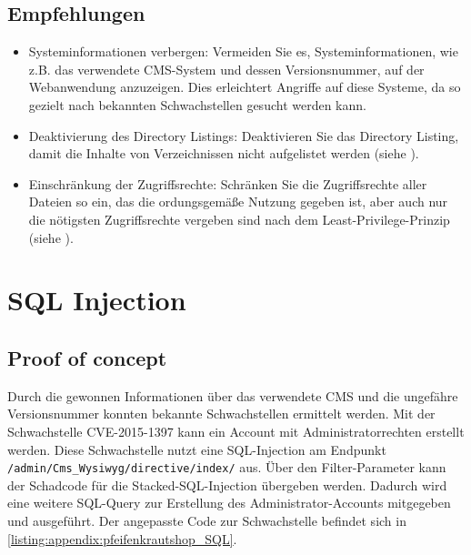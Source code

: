 \subsection*{Empfehlungen}
\begin{itemize}
    \item Systeminformationen verbergen: Vermeiden Sie es, Systeminformationen, wie z.B. das verwendete CMS-System und dessen Versionsnummer, auf der Webanwendung anzuzeigen. Dies erleichtert Angriffe auf diese Systeme, da so gezielt nach bekannten Schwachstellen gesucht werden kann.
    \item Deaktivierung des Directory Listings: Deaktivieren Sie das Directory Listing, damit die Inhalte von Verzeichnissen nicht aufgelistet werden (siehe \cite{owaspSecurityMisconfiguration}).
    \item Einschränkung der Zugriffsrechte: Schränken Sie die Zugriffsrechte aller Dateien so ein, das die ordungsgemäße Nutzung gegeben ist, aber auch nur die nötigsten Zugriffsrechte vergeben sind nach dem Least-Privilege-Prinzip (siehe \cite{owaspSecurityMisconfiguration}).
\end{itemize}


\section{\makecvssbadge SQL Injection}

\subsection*{Proof of concept}
Durch die gewonnen Informationen über das verwendete CMS und die ungefähre Versionsnummer konnten bekannte Schwachstellen ermittelt werden. Mit der Schwachstelle CVE-2015-1397 kann ein Account mit Administratorrechten erstellt werden. Diese Schwachstelle nutzt eine SQL-Injection am Endpunkt \texttt{/admin/Cms\_Wysiwyg/directive/index/} aus. Über den Filter-Parameter kann der Schadcode für die Stacked-SQL-Injection übergeben werden. Dadurch wird eine weitere SQL-Query zur Erstellung des Administrator-Accounts mitgegeben und ausgeführt. Der angepasste Code zur Schwachstelle befindet sich in \autoref{listing:appendix:pfeifenkrautshop_SQL}.


